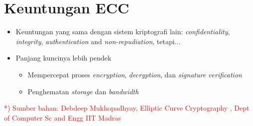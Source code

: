 \documentclass{article}
\begin{document}

\section*{Keuntungan ECC}

\begin{itemize}
    \item Keuntungan yang sama dengan sistem kriptografi lain: \textit{confidentiality}, \textit{integrity}, \textit{authentication} and \textit{non-repudiation}, tetapi...
    \item Panjang kuncinya lebih pendek
    \begin{itemize}
        \item Mempercepat proses \textit{encryption}, \textit{decryption}, dan \textit{signature verification}
        \item Penghematan \textit{storage} dan \textit{bandwidth}
    \end{itemize}
\end{itemize}

\vspace{50mm}

\textcolor{red}{*) Sumber bahan: Debdeep Mukhopadhyay, Elliptic Curve Cryptography , Dept of Computer Sc and Engg IIT Madras}
\end{document}
